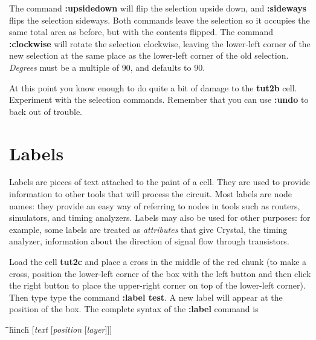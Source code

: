 \documentclass[letterpaper,twoside,12pt]{article}
\def\hinch{\hspace*{0.5in}}
\def\starti{\begin{center}\begin{tabbing}\hinch\=\hinch\=\hinch\=hinch\=\kill}
\def\endi{\end{tabbing}\end{center}}
\def\ii{\>\>\>}
\begin{document}
The command {\bfseries :upsidedown} will flip the selection upside
down, and {\bfseries :sideways} flips the selection sideways.  Both
commands leave the selection so it occupies the same total area
as before, but with the contents flipped.  The command
{\bfseries :clockwise} will rotate the selection clockwise, leaving the
lower-left corner of the new selection at the same place as the
lower-left corner of the old selection.  {\itshape Degrees}
must be a multiple of 90, and defaults to 90.

At this point you know enough to do quite a bit of damage
to the {\bfseries tut2b} cell.  Experiment with the selection
commands.  Remember that you can use {\bfseries :undo} to back
out of trouble.

\section{Labels}

Labels are pieces of text attached to the paint of a cell.
They are used to provide information to other tools that will
process the circuit.  Most labels are node names: they provide
an easy way of referring to nodes in tools such as routers, simulators,
and timing analyzers.  Labels may also be used for other purposes:
for example, some labels are treated as {\itshape attributes} that
give Crystal, the timing analyzer, information about the
direction of signal flow through transistors.

Load the cell {\bfseries tut2c} and place a cross in the middle of
the red chunk (to make a cross, position the lower-left corner
of the box with the left button and then click the right button
to place the upper-right corner on top of the lower-left corner).
Then type
type the command {\bfseries :label test}.  A new label will appear
at the position of the box.  The complete syntax of the {\bfseries :label}
command is

\starti
   \ii {\bfseries :label }[{\itshape text }[{\itshape position }[{\itshape layer}]]]
\endi
\end{document}
